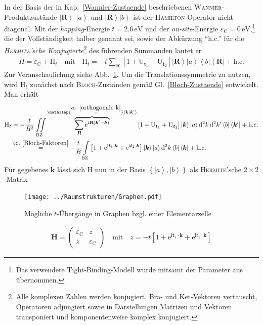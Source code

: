 \documentclass[a4paper, 10pt, twoside, openany]{book} %
\newcommand \bra[1]{\left \langle #1 \right |}
\newcommand \ket[1]{\left | #1 \right \rangle}
\newcommand \bracket[2]{\left \langle #1 \middle | #2 \right \rangle}
\newcommand \bracks[1]{\left [ #1 \right ]}
\newcommand \braces[1]{\left \lbrace #1 \right \rbrace}
\def \I {\mathrm i}
\def \E {\mathrm e}
\def \vec {\boldsymbol}
\newcommand \op[1]{\mathrm{#1}}
\newcommand \mat[1]{\begin{pmatrix} #1 \end{pmatrix}}
\def \eC {\varepsilon_\mathrm{C}}
\begin{document}
    In der Basis der in Kap.~\ref{Wannier-Zustaende} beschriebenen \textsc{Wannier}-Produktzustände $\ket{\vec R}$ $\ket a$ und $\ket{\vec R} \ket b$ ist der \textsc{Hamilton}-Operator nicht diagonal. Mit der \emph{hopping}-Energie $t = 2.6\,\mathrm{eV}$ und der \emph{on-site}-Energie $\eC = 0\,\mathrm{eV}$,\footnote{Das verwendete Tight-Binding-Modell wurde mitsamt der Parameter aus \cite[S.~2]{Wehling2} übernommen.} die der Vollständigkeit halber genannt sei, sowie der Abkürzung "`h.c."' für die \emph{\textsc{Hermite}'sche Konjugierte}\footnote{Alle komplexen Zahlen werden konjugiert, Bra- und Ket-Vektoren vertauscht, Operatoren adjungiert sowie in Darstellungen Matrizen und Vektoren transponiert und komponentenweise komplex konjugiert.} des führenden Summanden lautet er
	\begin{align}
		H = \eC + \op H_t \quad \text{mit} \quad \op H_t = -t \sum_{\vec R} \bracks{1 + \op U_{\vec t_1} + \op U_{\vec t_2}} \ket{\vec R} \ket a \bra b \bra{\vec R} + \text{h.c.}
		\label{Hamiltonian Graphen}
	\end{align}
    Zur Veranschaulichung siehe Abb.~\ref{Uebergaenge Graphen}. Um die Translationssymmetrie zu nutzen, wird $\op H_t$ zunächst nach \textsc{Bloch}-Zuständen gemäß Gl.~\ref{Bloch-Zustaende} entwickelt. Man erhält
	\begin{align*}
		\op H_t &= -\frac t {B^2} \iint \limits_{\rm BZ} \overbrace{\sum_{\vec R} \E^{\I \vec R (\vec k' - \vec k)}}^{\mathllap{\overset{\rm Gl.~\ref{orthogonale k}} =} \bracket{\vec k}{\vec k\smash'}} \bracks{1 + \op U_{\vec t_1} + \op U_{\vec t_2}} \ket{\vec k} \ket a \mathrm d^2 k \, \mathrm d^2 k' \bra b \bra{\vec k \smash '} + \text{h.c.} \\
		& \overset {\rm Gl.~\ref{Bloch-Faktoren}} = -\frac t B \int \limits_{\rm BZ} \bracks{1 + \E^{\I \vec t_1 \cdot \vec k} + \E^{\I \vec t_2 \cdot \vec k}} \ket{\vec k} \ket a \mathrm d^2 k \bra b \bra{\vec k} + \text{h.c.}
	\end{align*}
    Für gegebenes $\vec k$ lässt sich $\op H$ nun in der Basis $\braces{\ket a, \ket b}$ als \textsc{Hermite}'sche $2 \times 2$-Matrix
	\begin{figure}
		\centering
		\texttt{[image: ../Raumstrukturen/Graphen.pdf]}
		\caption{Mögliche $t$-Übergänge in Graphen bzgl. einer Elementarzelle}
		\label{Uebergaenge Graphen}
	\end{figure}
	\begin{align}
		\vec H = \mat{\eC & z \\ \overline z & \eC} \quad \text{mit} \quad z = -t \bracks{1 + \E^{\I \vec t_1 \cdot \vec k} + \E^{\I \vec t_2 \cdot \vec k}}
		\label{Energiematrix Graphen}
	\end{align}
\end{document}
